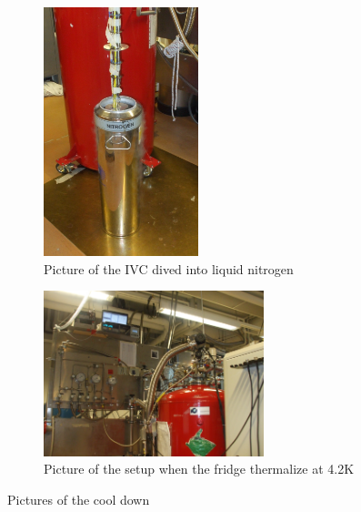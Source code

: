             
            \begin{figure}
            \begin{subfigure}[t]{0.48\textwidth}
            \centering
                \includegraphics[angle=90,width=4.5cm]{nitrogen.JPG}
                \caption{Picture of the IVC dived into liquid nitrogen}
                \label{nitrogen}
            \end{subfigure}
             \begin{subfigure}[t]{0.48\textwidth}
             \centering
                \includegraphics[width=6.4cm]{setup4K.JPG}
                \caption{Picture of the setup when the fridge thermalize at 4.2K}
                \label{Setup4K}
            \end{subfigure}
            \caption{Pictures of the cool down}
            \end{figure}
            
